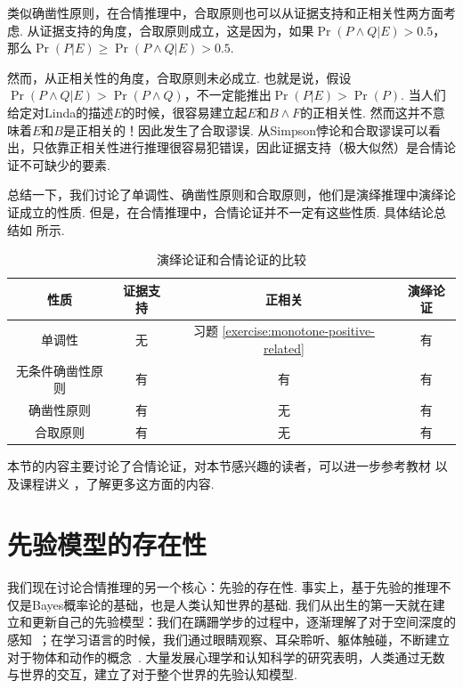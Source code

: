 类似确凿性原则，在合情推理中，合取原则也可以从证据支持和正相关性两方面考虑. 从证据支持的角度，合取原则成立，这是因为，如果$\Pr(P\wedge Q|E)>0.5$，那么$\Pr(P|E)\geq \Pr(P\wedge Q|E)>0.5$.

然而，从正相关性的角度，合取原则未必成立. 也就是说，假设$\Pr(P\wedge Q|E)>\Pr(P\wedge Q)$，不一定能推出$\Pr(P|E)>\Pr(P)$. 当人们给定对Linda的描述$E$的时候，很容易建立起$E$和$B\wedge F$的正相关性. 然而这并不意味着$E$和$B$是正相关的！因此发生了合取谬误. 从Simpson悖论和合取谬误可以看出，只依靠正相关性进行推理很容易犯错误，因此证据支持（极大似然）是合情论证不可缺少的要素.

总结一下，我们讨论了单调性、确凿性原则和合取原则，他们是演绎推理中演绎论证成立的性质. 但是，在合情推理中，合情论证并不一定有这些性质. 具体结论总结如 所示.

\begin{table}[htbp]
    \centering
    \begin{tabular}{c|ccc}
        \toprule
        性质 & 证据支持 & 正相关& 演绎论证\\ \midrule
        单调性 & 无 & 习题 \ref{exercise:monotone-positive-related} & 有 \\
        无条件确凿性原则 & 有 & 有 & 有 \\
        确凿性原则 & 有 & 无 & 有 \\
        合取原则 & 有 & 无 & 有 \\
        \bottomrule
    \end{tabular}
    \caption{演绎论证和合情论证的比较}
    \label{tab:reasoning-comparison}
\end{table}

\begin{remark}
    本节的内容主要讨论了合情论证，对本节感兴趣的读者，可以进一步参考教材 \cite{skyrmsChoiceChanceIntroduction1975} 以及课程讲义 \cite{pacuitReasoningHumansClear}，了解更多这方面的内容. 
\end{remark}

\section{先验模型的存在性}

我们现在讨论合情推理的另一个核心：先验的存在性. 事实上，基于先验的推理不仅是Bayes概率论的基础，也是人类认知世界的基础. 我们从出生的第一天就在建立和更新自己的先验模型：我们在蹒跚学步的过程中，逐渐理解了对于空间深度的感知~\cite{walkComparativeAnalyticalStudy1961}；在学习语言的时候，我们通过眼睛观察、耳朵聆听、躯体触碰，不断建立对于物体和动作的概念~\cite{vongGroundedLanguageAcquisition2024,saffranStatisticalLearning8MonthOld1996}. 大量发展心理学和认知科学的研究表明，人类通过无数与世界的交互，建立了对于整个世界的先验认知模型.

